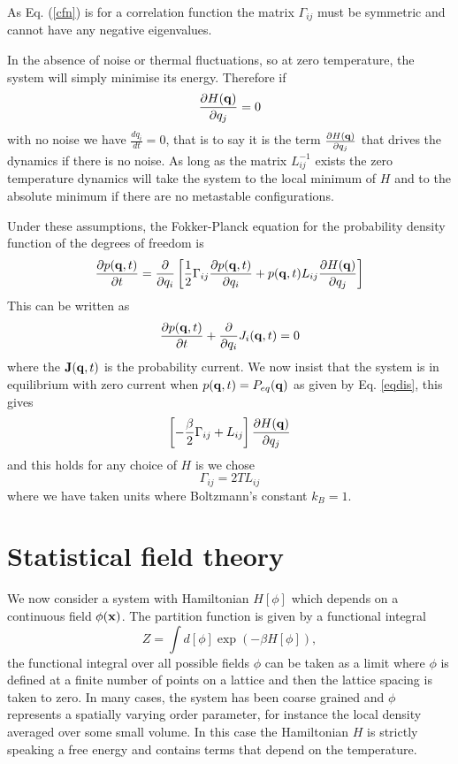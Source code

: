 As Eq. (\ref{cfn}) is for a correlation function the matrix $\Gamma_{ij}$ must be symmetric and cannot have any negative eigenvalues.

In the absence of noise or thermal fluctuations, so at zero temperature, the system will simply minimise its energy. Therefore if 
\begin{equation}
    \frac{\partial H({\bf q})}{ \partial q_j} =0
\end{equation}
with no noise we have $\frac{d q_i}{dt}=0$, that is to say it is the term $\frac{\partial H({\bf q})}{ \partial q_j}$ that drives the dynamics if there is no noise. As long as the matrix $L_{ij}^{-1}$ exists the zero temperature dynamics will take the system to the local minimum of $H$ and to the absolute minimum if there are no metastable configurations. 

Under these assumptions, the Fokker-Planck equation for the probability density function of the degrees of freedom is 
\begin{equation}
    \frac{\partial p({\bf q},t)}{\partial t} =  \frac{\partial}{\partial q_i} \left[\frac{1}{2}\Gamma_{ij} \frac{\partial p({\bf q},t)}{\partial q_i} + p({\bf q},t) L_{ij}\frac{\partial H({\bf q})}{ \partial q_j}\right]
\end{equation}
This can be written as 
\begin{equation}
    \frac{\partial p({\bf q},t)}{\partial t} +\frac{\partial}{\partial q_i}J_i({\bf q},t)=0
\end{equation}
where the ${\bf J}({\bf q},t)$ is the probability current. We now insist that the system is in equilibrium with zero current when $p({\bf q},t)= P_{eq}({\bf q})$ as given by Eq. \eqref{eqdis}, this gives
\begin{equation}
    \left[-\frac{\beta}{2}\Gamma_{ij} + L_{ij}\right]\frac{\partial H({\bf q})}{ \partial q_j}
\end{equation}
and this holds for any choice of $H$ is we chose
\begin{equation}
    \Gamma_{ij}= 2T L_{ij}
\end{equation}
where we have taken units where Boltzmann's constant $k_B=1$. 

    \section{Statistical field theory}

We now consider a system with Hamiltonian $H[\phi]$ which depends on a continuous field  $\phi({\bf x})$. The partition function is given by a functional integral
\begin{equation}
    Z = \int d[\phi] \exp(-\beta H[\phi]),
\end{equation}
the functional integral over all possible fields $\phi$ can be taken as a limit where $\phi$ is defined at a finite number of points on a lattice and then the lattice spacing is taken to zero. 
In many cases, the system has been coarse grained and $\phi$ represents a spatially varying order parameter, for instance the local density averaged over some small volume. In this case the Hamiltonian $H$ is strictly speaking a free energy  and contains terms that depend on the temperature.

